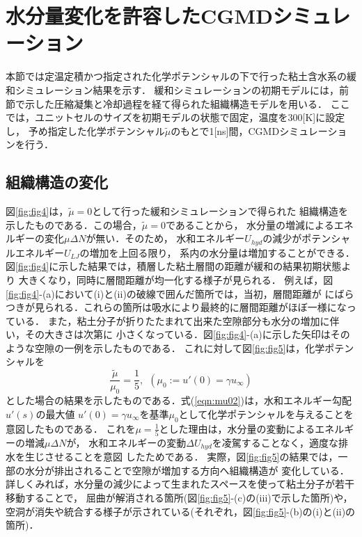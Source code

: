 \section{水分量変化を許容したCGMDシミュレーション}
本節では定温定積かつ指定された化学ポテンシャルの下で行った粘土含水系の緩和シミュレーション結果を示す．
緩和シミュレーションの初期モデルには，前節で示した圧縮凝集と冷却過程を経て得られた組織構造モデルを用いる．
ここでは，ユニットセルのサイズを初期モデルの状態で固定，温度を300[K]に設定し，
予め指定した化学ポテンシャル$\tilde \mu$のもとで1[ns]間，CGMDシミュレーションを行う．
\subsection{組織構造の変化}
図\ref{fig:fig4}は，$\tilde \mu=0$として行った緩和シミュレーションで得られた
組織構造を示したものである．この場合，$\tilde \mu=0$であることから，
水分量の増減によるエネルギーの変化$\mu \Delta N$が無い．そのため，
水和エネルギー$U_{hyd}$の減少がポテンシャルエネルギー$U_{LJ}$の増加を上回る限り，
系内の水分量は増加することができる．
図\ref{fig:fig4}に示した結果では，積層した粘土層間の距離が緩和の結果初期状態より
大きくなり，同時に層間距離が均一化する様子が見られる．
例えば，図\ref{fig:fig4}-(a)において(i)と(ii)の破線で囲んだ箇所では，当初，層間距離が
にばらつきが見られる．これらの箇所は吸水により最終的に層間距離がほぼ一様になっている．
また，粘土分子が折りたたまれて出来た空隙部分も水分の増加に伴い，その大きさは次第に
小さくなっている．図\ref{fig:fig4}-(a)に示した矢印はそのような空隙の一例を示したものである．
%
これに対して図\ref{fig:fig5}は，化学ポテンシャルを
\begin{equation}
	\frac{\tilde \mu}{\mu _0}= \frac{1}{5}
	, \ \ 
	\left( 
		\mu_0:=u'(0)=\gamma u_\infty
	\right)
	\label{eqn:mu02}
\end{equation}
とした場合の結果を示したものである．式(\ref{eqn:mu02})は，水和エネルギー勾配$u'(s)$の最大値
$u'(0)=\gamma u_{\infty}$を基準$\mu_0$として化学ポテンシャルを与えることを意図したものである．
これを$\mu=\frac{1}{5}$とした理由は，水分量の変動によるエネルギーの増減$\mu \Delta N$が，
水和エネルギーの変動$\Delta U_{hyd}$を凌駕することなく，適度な排水を生じさせることを意図
したためである．
実際，図\ref{fig:fig5}の結果では，一部の水分が排出されることで空隙が増加する方向へ組織構造が
変化している．詳しくみれば，水分量の減少によって生まれたスペースを使って粘土分子が若干移動することで，
屈曲が解消される箇所(図\ref{fig:fig5}-(c)の(iii)で示した箇所)や，
空洞が消失や統合する様子が示されている(それぞれ，図\ref{fig:fig5}-(b)の(i)と(ii)の箇所)．
